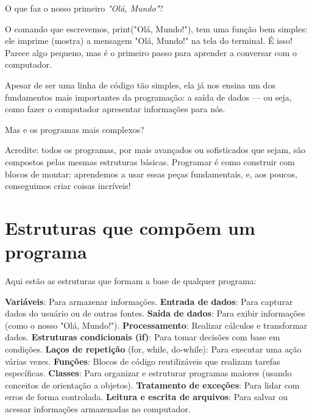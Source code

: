 \documentclass[12pt]{book}
\begin{document}
	O que faz o nosso primeiro \textit{"Olá, Mundo"}?
	
	O comando que escrevemos, print("Olá, Mundo!"), tem uma função bem simples: ele imprime (mostra) a mensagem "Olá, Mundo!" na tela do terminal. É isso! Parece algo pequeno, mas é o primeiro passo para aprender a conversar com o computador.
	
	Apesar de ser uma linha de código tão simples, ela já nos ensina um dos fundamentos mais importantes da programação: a saída de dados — ou seja, como fazer o computador apresentar informações para nós.
	
	Mas e os programas mais complexos?
	
	Acredite: todos os programas, por mais avançados ou sofisticados que sejam, são compostos pelas mesmas estruturas básicas. Programar é como construir com blocos de montar: aprendemos a usar essas peças fundamentais, e, aos poucos, conseguimos criar coisas incríveis!
	
	\section{Estruturas que compõem um programa}
	
	Aqui estão as estruturas que formam a base de qualquer programa:
	
	\textbf{Variáveis}: Para armazenar informações.\newline
	\textbf{Entrada de dados}: Para capturar dados do usuário ou de outras fontes.\newline
	\textbf{Saída de dados}: Para exibir informações (como o nosso "Olá, Mundo!").\newline
	\textbf{Processamento}: Realizar cálculos e transformar dados.\newline
	\textbf{Estruturas condicionais (if)}: Para tomar decisões com base em condições.\newline
	\textbf{Laços de repetição }(for, while, do-while): Para executar uma ação várias vezes.\newline
	\textbf{Funções}: Blocos de código reutilizáveis que realizam tarefas específicas.\newline
	\textbf{Classes}: Para organizar e estruturar programas maiores (usando conceitos de orientação a objetos).\newline
	\textbf{Tratamento de exceções}: Para lidar com erros de forma controlada.\newline
	\textbf{Leitura e escrita de arquivos}: Para salvar ou acessar informações armazenadas no computador.\newline
	
\end{document}
